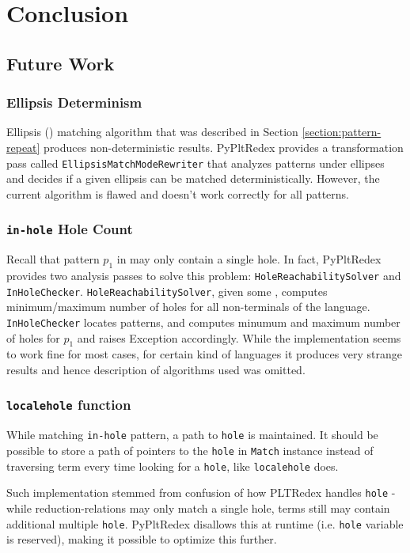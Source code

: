 \chapter{Conclusion} 

\section{Future Work}
\subsection{Ellipsis Determinism}
Ellipsis (\RepeatNoArg) matching algorithm that was described in Section \ref{section:pattern-repeat} produces non-deterministic results. PyPltRedex provides a transformation pass called \texttt{EllipsisMatchModeRewriter} that analyzes patterns under ellipses and decides if a given ellipsis can be matched deterministically. However, the current algorithm is flawed and doesn't work correctly for all patterns.

\subsection{\texttt{in-hole} Hole Count}
Recall that pattern $p_1$ in \PatternInHole \space may only contain a single hole. In fact, PyPltRedex provides two analysis passes to solve this problem: \texttt{HoleReachabilitySolver} and \texttt{InHoleChecker}. \texttt{HoleReachabilitySolver}, given some \DefineLanguageNoArg, computes minimum/maximum number of holes for all non-terminals of the language. \texttt{InHoleChecker} locates \PatternInHoleNoArg patterns, and computes minumum and maximum number of holes for $p_1$ and raises Exception accordingly. While the implementation seems to work fine for most cases, for certain kind of languages it produces very strange results and hence description of algorithms used was omitted.

\subsection{\texttt{localehole} function}
While matching \texttt{in-hole} pattern, a path to \texttt{hole} is maintained. It should be possible to store a path of pointers to the \texttt{hole} in \texttt{Match} instance instead of traversing term every time looking for a \texttt{hole}, like \texttt{localehole} does.

Such implementation stemmed from confusion of how PLTRedex handles \texttt{hole} - while reduction-relations may only match a single hole, terms still may contain additional multiple \texttt{hole}. PyPltRedex disallows this at runtime (i.e. \texttt{hole} variable is reserved), making it possible to optimize this further.

